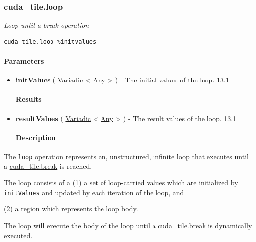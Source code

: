 \documentclass{article}
\begin{document}
\subsubsection{cuda\_tile.loop}

\textit{Loop until a break operation}


\begin{lstlisting}
cuda_tile.loop %initValues
\end{lstlisting}

\paragraph{Parameters}

\begin{itemize}
\item \textbf{initValues} ( \href{https://docs.nvidia.com/cuda/tile-ir/latest/sections/operations.html#type-variadic}{Variadic} < \href{https://docs.nvidia.com/cuda/tile-ir/latest/sections/operations.html#type-any}{Any} > ) - The initial values of the loop. 13.1


\paragraph{Results}

\item \textbf{resultValues} ( \href{https://docs.nvidia.com/cuda/tile-ir/latest/sections/operations.html#type-variadic}{Variadic} < \href{https://docs.nvidia.com/cuda/tile-ir/latest/sections/operations.html#type-any}{Any} > ) - The result values of the loop. 13.1


\paragraph{Description}

\end{itemize}
The \texttt{loop} operation represents an, unstructured, infinite loop that executes until a \href{https://docs.nvidia.com/cuda/tile-ir/latest/sections/operations.html#op-cuda-tile-break}{cuda\_tile.break} is reached.


The loop consists of a (1) a set of loop-carried values which are initialized by \texttt{initValues} and updated by each iteration of the loop, and

(2) a region which represents the loop body.


The loop will execute the body of the loop until a \href{https://docs.nvidia.com/cuda/tile-ir/latest/sections/operations.html#op-cuda-tile-break}{cuda\_tile.break} is dynamically executed.
\end{document}

